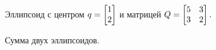 \clearpage
\begin{figure}[t]
        \centering
        
        \caption{Эллипсоид с центром $q = \protect\begin{bmatrix}1\\2\protect\end{bmatrix}$ и матрицей $Q = \protect\begin{bmatrix}5&3\\3&2\protect\end{bmatrix}.$}
\end{figure}
\begin{figure}[b]
        \centering
        
        \caption{Сумма двух эллипсоидов.}
\end{figure}




\clearpage
\begin{thebibliography}{9}

\end{thebibliography}
